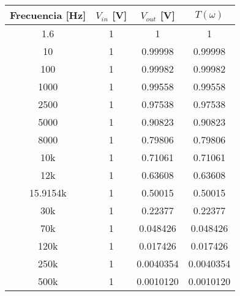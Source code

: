 \documentclass[letterpaper,11pt]{article} %
\begin{document}
\begin{center}
\begin{tabular}{|c|c|c|c|}
\hline
\textbf{Frecuencia {[}Hz{]}} & \textbf{$V_{in}$ {[}V{]}} & \textbf{$V_{out}$ {[}V{]}} & \textbf{$T(\omega)$} \\ \hline
1.6                          & 1                         & 1                          & 1                    \\ \hline
10                           & 1                         & 0.99998                    & 0.99998              \\ \hline
100                          & 1                         & 0.99982                    & 0.99982              \\ \hline
1000                         & 1                         & 0.99558                    & 0.99558              \\ \hline
2500                         & 1                         & 0.97538                    & 0.97538              \\ \hline
5000                         & 1                         & 0.90823                    & 0.90823              \\ \hline
8000                         & 1                         & 0.79806                    & 0.79806              \\ \hline
10k                          & 1                         & 0.71061                    & 0.71061              \\ \hline
12k                          & 1                         & 0.63608                    & 0.63608              \\ \hline
15.9154k                     & 1                         & 0.50015                    & 0.50015              \\ \hline
30k                          & 1                         & 0.22377                    & 0.22377              \\ \hline
70k                          & 1                         & 0.048426                   & 0.048426             \\ \hline
120k                         & 1                         & 0.017426                   & 0.017426             \\ \hline
250k                         & 1                         & 0.0040354                  & 0.0040354            \\ \hline
500k                         & 1                         & 0.0010120                  & 0.0010120            \\ \hline

\end{tabular}
\end{center}
\end{document}
